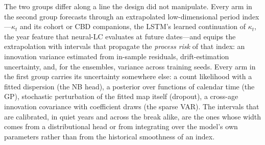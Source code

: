 The two groups differ along a line the design did not manipulate. Every
arm in the second group forecasts through an extrapolated
low-dimensional period index---$\kappa_t$ and its cohort or CBD
companions, the LSTM's learned continuation of $\kappa_t$, the year
feature that neural-LC evaluates at future dates---and equips the
extrapolation with intervals that propagate the \emph{process risk} of
that index: an innovation variance estimated from in-sample residuals,
drift-estimation uncertainty, and, for the ensembles, variance across
training seeds. Every arm in the first group carries its uncertainty
somewhere else: a count likelihood with a fitted dispersion (the NB
head), a posterior over functions of calendar time (the GP), stochastic
perturbation of the fitted map itself (dropout), a cross-age innovation
covariance with coefficient draws (the sparse VAR). The intervals that
are calibrated, in quiet years and across the break alike, are the ones
whose width comes from a distributional head or from integrating over
the model's own parameters rather than from the historical smoothness of
an index.

